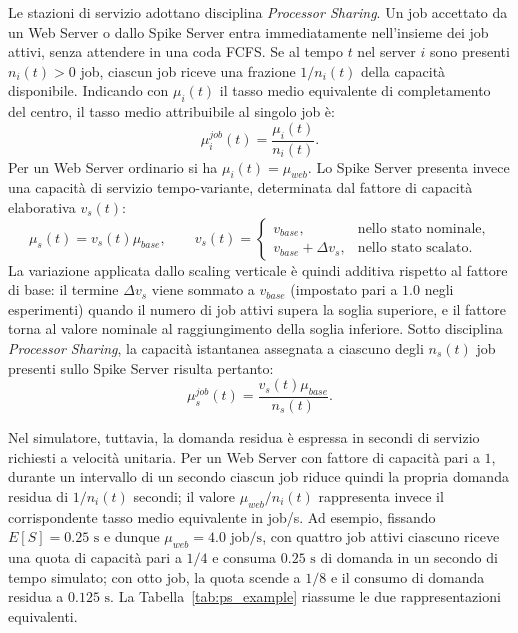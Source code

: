 ﻿\documentclass[a4paper,12pt]{article}
\begin{document}
Le stazioni di servizio adottano disciplina \textit{Processor Sharing}. Un job accettato da un Web Server o dallo Spike Server entra immediatamente nell'insieme dei job attivi, senza attendere in una coda FCFS. Se al tempo $t$ nel server $i$ sono presenti $n_i(t)>0$ job, ciascun job riceve una frazione $1/n_i(t)$ della capacità disponibile. Indicando con $\mu_i(t)$ il tasso medio equivalente di completamento del centro, il tasso medio attribuibile al singolo job è:
\begin{equation}
    \mu_i^{job}(t)=\frac{\mu_i(t)}{n_i(t)}.
\end{equation}
Per un Web Server ordinario si ha $\mu_i(t)=\mu_{web}$. Lo Spike Server presenta invece una capacità di servizio tempo-variante, determinata dal fattore di capacità elaborativa $v_s(t)$:
\begin{equation}
    \mu_s(t)=v_s(t)\mu_{base},
    \qquad
    v_s(t)=
    \begin{cases}
        v_{base}, & \text{nello stato nominale},\\
        v_{base}+\Delta v_s, & \text{nello stato scalato}.
    \end{cases}
\end{equation}
La variazione applicata dallo scaling verticale è quindi additiva rispetto al fattore di base: il termine $\Delta v_s$ viene sommato a $v_{base}$ (impostato pari a $1.0$ negli esperimenti) quando il numero di job attivi supera la soglia superiore, e il fattore torna al valore nominale al raggiungimento della soglia inferiore. Sotto disciplina \textit{Processor Sharing}, la capacità istantanea assegnata a ciascuno degli $n_s(t)$ job presenti sullo Spike Server risulta pertanto:
\begin{equation}
    \mu_s^{job}(t)=\frac{v_s(t)\mu_{base}}{n_s(t)}.
\end{equation}

Nel simulatore, tuttavia, la domanda residua è espressa in secondi di servizio richiesti a velocità unitaria. Per un Web Server con fattore di capacità pari a $1$, durante un intervallo di un secondo ciascun job riduce quindi la propria domanda residua di $1/n_i(t)$ secondi; il valore $\mu_{web}/n_i(t)$ rappresenta invece il corrispondente tasso medio equivalente in job/s. Ad esempio, fissando $E[S]=0.25\text{ s}$ e dunque $\mu_{web}=4.0\text{ job/s}$, con quattro job attivi ciascuno riceve una quota di capacità pari a $1/4$ e consuma $0.25\text{ s}$ di domanda in un secondo di tempo simulato; con otto job, la quota scende a $1/8$ e il consumo di domanda residua a $0.125\text{ s}$. La Tabella~\ref{tab:ps_example} riassume le due rappresentazioni equivalenti.
\end{document}
